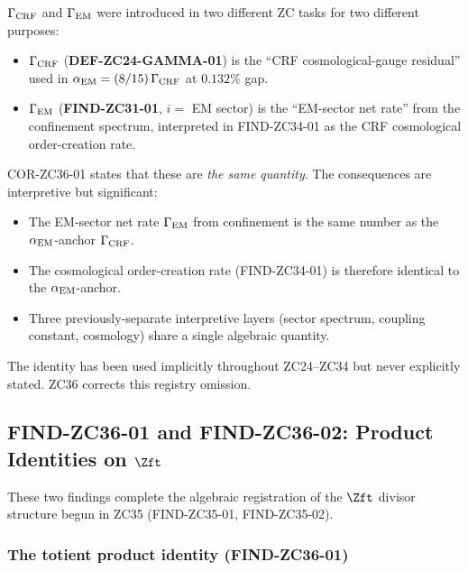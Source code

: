\documentclass[12pt, a4paper]{article}
\begin{document}
\begin{keybox}[title={Interpretive consequences of COR-ZC36-01}]
$\Gamma_{\rm CRF}$ and $\Gamma_{\rm EM}$ were introduced in
two different ZC tasks for two different purposes:
\begin{itemize}[leftmargin=*, noitemsep]
  \item $\Gamma_{\rm CRF}$ (\textbf{DEF-ZC24-GAMMA-01}) is the
        ``CRF cosmological-gauge residual'' used in
        $\alpha_{\rm EM} = (8/15)\,\Gamma_{\rm CRF}$ at
        $0.132\%$ gap.
  \item $\Gamma_{\rm EM}$ (\textbf{FIND-ZC31-01}, $i = $ EM
        sector) is the ``EM-sector net rate'' from the
        confinement spectrum, interpreted in FIND-ZC34-01 as
        the CRF cosmological order-creation rate.
\end{itemize}
COR-ZC36-01 states that these are \emph{the same quantity}.
The consequences are interpretive but significant:
\begin{itemize}[leftmargin=*, noitemsep]
  \item The EM-sector net rate $\Gamma_{\rm EM}$ from
        confinement is the same number as the
        $\alpha_{\rm EM}$-anchor $\Gamma_{\rm CRF}$.
  \item The cosmological order-creation rate (FIND-ZC34-01)
        is therefore identical to the $\alpha_{\rm EM}$-anchor.
  \item Three previously-separate interpretive layers
        (sector spectrum, coupling constant, cosmology) share
        a single algebraic quantity.
\end{itemize}
The identity has been used implicitly throughout ZC24--ZC34
but never explicitly stated. ZC36 corrects this registry
omission.
\end{keybox}

\subsection{FIND-ZC36-01 and FIND-ZC36-02: Product Identities
        on $\Zft$}
\label{sec:product-identities}

These two findings complete the algebraic registration of the
$\Zft$ divisor structure begun in ZC35 (FIND-ZC35-01,
FIND-ZC35-02).

\subsubsection{The totient product identity (FIND-ZC36-01)}
\end{document}
